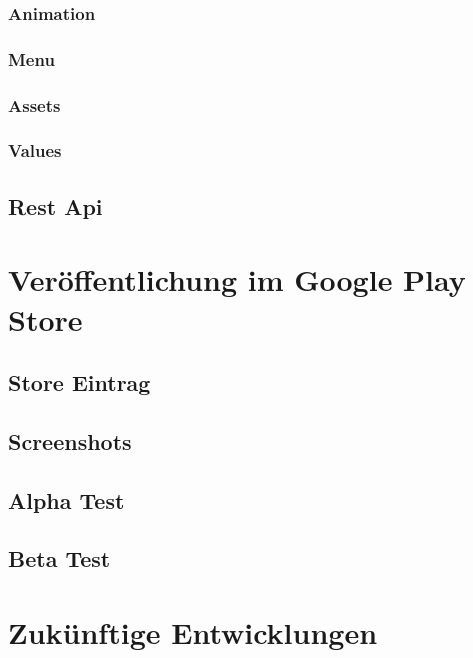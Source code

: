 \documentclass{scrartcl}
\begin{document}
\subsubsection{Animation}

\subsubsection{Menu}

\subsubsection{Assets}

\subsubsection{Values}

\subsection{Rest Api}


\newpage

\section{Veröffentlichung im Google Play Store}

\subsection{Store Eintrag}

\subsection{Screenshots}

\subsection{Alpha Test}

\subsection{Beta Test}


\newpage

\section{Zukünftige Entwicklungen}
\end{document}
